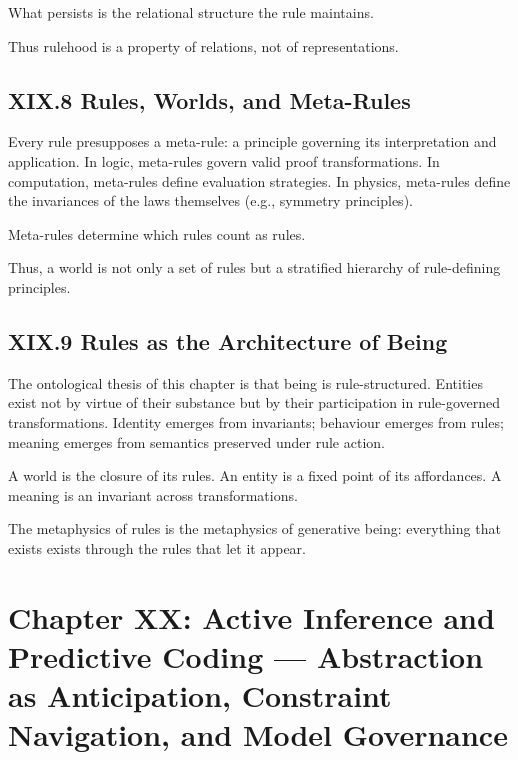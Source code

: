 \documentclass[12pt,letterpaper]{article}
\begin{document}
What persists is the relational structure the rule maintains.

Thus rulehood is a property of relations, not of representations.

\subsection{XIX.8 Rules, Worlds, and Meta-Rules}

Every rule presupposes a meta-rule: a principle governing its interpretation and application. In logic, meta-rules govern valid proof transformations. In computation, meta-rules define evaluation strategies. In physics, meta-rules define the invariances of the laws themselves (e.g., symmetry principles).

Meta-rules determine which rules count as rules.

Thus, a world is not only a set of rules but a stratified hierarchy of rule-defining principles.

\subsection{XIX.9 Rules as the Architecture of Being}

The ontological thesis of this chapter is that being is rule-structured. Entities exist not by virtue of their substance but by their participation in rule-governed transformations. Identity emerges from invariants; behaviour emerges from rules; meaning emerges from semantics preserved under rule action.

A world is the closure of its rules.  
An entity is a fixed point of its affordances.  
A meaning is an invariant across transformations.

The metaphysics of rules is the metaphysics of generative being: everything that exists exists through the rules that let it appear.

\newpage
\section{Chapter XX: Active Inference and Predictive Coding —  
Abstraction as Anticipation, Constraint Navigation, and Model Governance}
\end{document}
